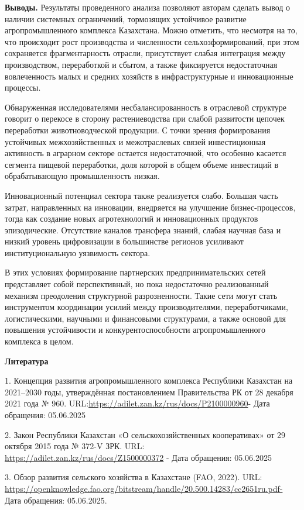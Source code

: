 {\bfseries Выводы.} Результаты проведенного анализа позволяют авторам
сделать вывод о наличии системных ограничений, тормозящих устойчивое
развитие агропромышленного комплекса Казахстана. Можно отметить, что
несмотря на то, что происходит рост производства и численности
сельхозформирований, при этом сохраняется фрагментарность отрасли,
присутствует слабая интеграция между производством, переработкой и
сбытом, а также фиксируется недостаточная вовлеченность малых и средних
хозяйств в инфраструктурные и инновационные процессы.

Обнаруженная исследователями несбалансированность в отраслевой структуре
говорит о перекосе в сторону растениеводства при слабой развитости
цепочек переработки животноводческой продукции. С точки зрения
формирования устойчивых межхозяйственных и межотраслевых связей
инвестиционная активность в аграрном секторе остается недостаточной, что
особенно касается сегмента пищевой переработки, доля которой в общем
объеме инвестиций в обрабатывающую промышленность низкая.

Инновационный потенциал сектора также реализуется слабо. Большая часть
затрат, направленных на инновации, внедряется на улучшение
бизнес-процессов, тогда как создание новых агротехнологий и
инновационных продуктов эпизодические. Отсутствие каналов трансфера
знаний, слабая научная база и низкий уровень цифровизации в большинстве
регионов усиливают институциональную уязвимость сектора.

В этих условиях формирование партнерских предпринимательских сетей
представляет собой перспективный, но пока недостаточно реализованный
механизм преодоления структурной разрозненности. Такие сети могут стать
инструментом координации усилий между производителями, переработчиками,
логистическими, научными и финансовыми структурами, а также основой для
повышения устойчивости и конкурентоспособности агропромышленного
комплекса в целом.

{\bfseries Литература}

1. Концепция развития агропромышленного комплекса Республики Казахстан
на 2021--2030 годы, утверждённая постановлением Правительства РК от 28
декабря 2021 года № 960.
URL:\url{https://adilet.zan.kz/rus/docs/P2100000960}- Дата обращения:
05.06.2025

2. Закон Республики Казахстан «О сельскохозяйственных кооперативах» от
29 октября 2015 года № 372-V ЗРК. URL:
\url{https://adilet.zan.kz/rus/docs/Z1500000372} - Дата обращения:
05.06.2025

3. Обзор развития сельского хозяйства в Казахстане (FAO, 2022). URL:
\url{https://openknowledge.fao.org/bitstream/handle/20.500.14283/cc2651ru.pdf-}
Дата обращения: 05.06.2025.

